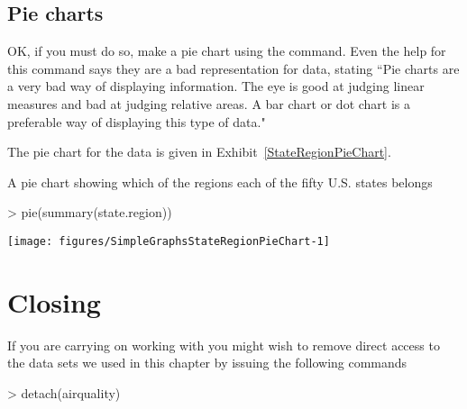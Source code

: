\subsection{Pie charts}

OK, if you must do so, make a pie chart using the  command. Even the help for this command says they are a bad representation for data, stating ``Pie charts are a very bad way of displaying information. The eye is good at judging linear measures and bad at judging relative areas. A bar chart or dot chart is a preferable way of displaying this type of data." 

The pie chart for the  data is given in Exhibit~\ref{StateRegionPieChart}.
\begin{exhibit}
\begin{center}
\caption{A pie chart showing which of the regions each of the fifty U.S. states belongs}
\label{StateRegionPieChart}
\begin{Schunk}
\begin{Sinput}
> pie(summary(state.region))
\end{Sinput}

\texttt{[image: figures/SimpleGraphsStateRegionPieChart-1]} \end{Schunk}
\end{center}
\end{exhibit}


\section{Closing}

If you are carrying on working with \R{} you might wish to remove direct access to the data sets we used in this chapter by issuing the following commands
\begin{Schunk}
\begin{Sinput}
> detach(airquality)
\end{Sinput}
\end{Schunk}


